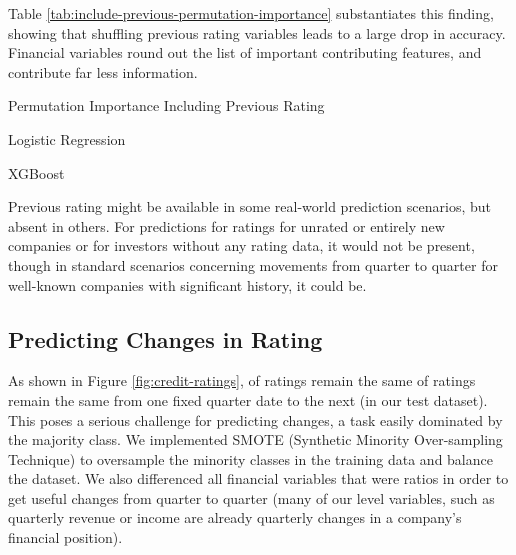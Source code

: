 \documentclass{article}[11pt]
\begin{document}
    Table \ref{tab:include-previous-permutation-importance} substantiates this finding, showing that shuffling previous rating variables leads to a large drop in accuracy. Financial variables round out the list of important contributing features, and contribute far less information.

    \begin{table}[h!]
        \centering
        \caption{Permutation Importance Including Previous Rating}
        \begin{minipage}[c]{0.495\linewidth}
            \centering
            
            \caption*{\footnotesize Logistic Regression} 
        \end{minipage}
        \begin{minipage}[c]{0.495\linewidth}
            \centering
            
            \caption*{\footnotesize XGBoost} 
        \end{minipage}
        \label{tab:include-previous-permutation-importance}
    \end{table}

    Previous rating might be available in some real-world prediction scenarios, but absent in others. For predictions for ratings for unrated or entirely new companies or for investors without any rating data, it would not be present, though in standard scenarios concerning movements from quarter to quarter for well-known companies with significant history, it could be.

    \clearpage
    \newpage

    \subsection{Predicting Changes in Rating}

    \label{sec:change-prediction}

    As shown in Figure \ref{fig:credit-ratings}, \shareNotChanges \space of ratings remain the same of ratings remain the same from one fixed quarter date to the next (\shareNotChangesTest \space in our test dataset). This poses a serious challenge for predicting changes, a task easily dominated by the majority class. We implemented SMOTE (Synthetic Minority Over-sampling Technique) \citep{chawla_smote_2002} to oversample the minority classes in the training data and balance the dataset. We also differenced all financial variables that were ratios in order to get useful changes from quarter to quarter (many of our level variables, such as quarterly revenue or income are already quarterly changes in a company's financial position).
\end{document}
